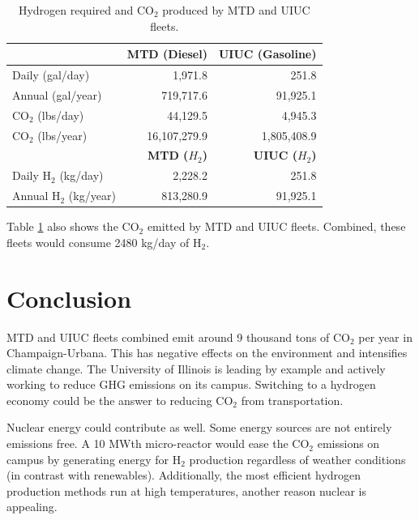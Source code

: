 \documentclass{anstrans}
\begin{document}
\begin{table}[H]
	\centering
    \caption{Hydrogen required and CO$_2$ produced by \gls{MTD} and \gls{UIUC} fleets.}
    \label{tab:h2req}
\begin{tabular}{l|rr}
\hline
                   & \textbf{MTD (Diesel)}   & \textbf{UIUC (Gasoline)}  \\ \hline
                   Daily (gal/day)    & 1,971.8        & 251.8            \\
                   Annual (gal/year)    & 719,717.6      & 91,925.1         \\
                CO$_2$ (lbs/day)   & 44,129.5       & 4,945.3          \\
                CO$_2$ (lbs/year)  & 16,107,279.9   & 1,805,408.9      \\ \hline
                   & \textbf{MTD ($H_2$)}   & \textbf{UIUC ($H_2$)}  \\ \hline
                Daily H$_2$ (kg/day)    & 2,228.2        & 251.8            \\
                Annual H$_2$ (kg/year)   & 813,280.9      & 91,925.1         \\\hline
\end{tabular}
\end{table}

Table \ref{tab:h2req} also shows the CO$_2$ emitted by \gls{MTD} and UIUC fleets.
Combined, these fleets would consume 2480 kg/day of H$_2$.

\section{Conclusion}

\gls{MTD} and \gls{UIUC} fleets combined emit around 9 thousand tons of CO$_2$ per year in Champaign-Urbana. This has negative effects on the environment and intensifies climate change. The University of Illinois is leading by example and actively working to reduce \gls{GHG} emissions on its campus. Switching to a hydrogen economy could be the answer to reducing CO$_2$ from transportation.

Nuclear energy could contribute as well. Some energy sources are not entirely emissions free. A 10 MWth micro-reactor would ease the CO$_2$ emissions on campus by generating energy for H$_2$ production regardless of weather conditions (in contrast with renewables). Additionally, the most efficient hydrogen production methods run at high temperatures, another reason nuclear is appealing.
\end{document}
